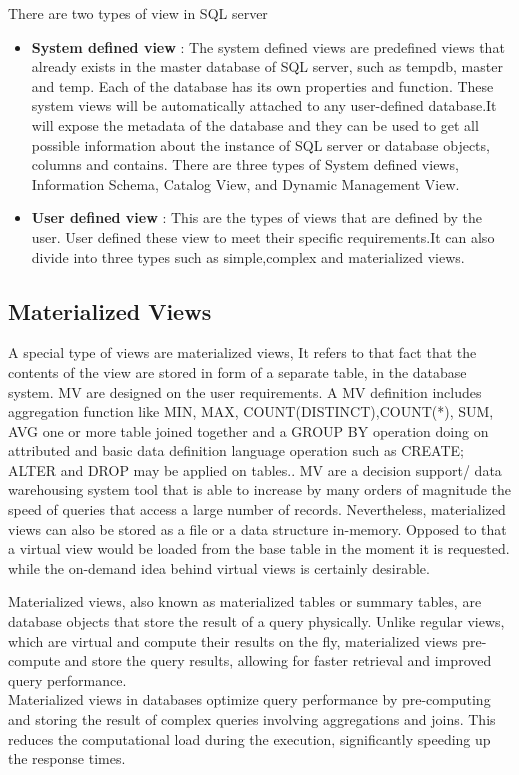There are two types of view in SQL server
\begin{itemize}
    \item \textbf{System defined view }: The system defined views are predefined views that already exists in the  master database of SQL server, such as tempdb, master and temp. Each of the database has its own properties and function. These system views will be automatically attached to any user-defined database.It will expose the metadata of the database and they can be used to get all possible information about the instance of SQL server or database objects, columns and contains. There are three types of System defined views, Information Schema, Catalog View, and Dynamic Management View. \cite{chauhan-2024}
    \item \textbf{User defined view }: This are the types of views that are defined by the user. User defined these view to meet their specific requirements.It can also divide into three types such as simple,complex and materialized views.\cite{javapoint-author-2024}
\end{itemize}
   
\subsection{Materialized Views }
 A special type of views are materialized views, It refers to that fact that the contents of the view are stored in form of a separate table, in the database system. MV are designed on the user requirements. A MV definition includes aggregation function like MIN, MAX, COUNT(DISTINCT),COUNT(*), SUM, AVG one or more table joined together and a GROUP BY operation doing on attributed and basic data definition language operation such as CREATE; ALTER and DROP may be applied on tables.\cite{Kardel_Thakare}. MV are a decision support/ data warehousing system tool that is able to increase by many orders of magnitude the speed of queries that access a large number of records.\cite{Kishan_Sainath} Nevertheless, materialized views can also be stored as a file or a data structure in-memory. Opposed to that a virtual view would be loaded from the base table in the moment it is requested. while the on-demand idea behind virtual views is certainly desirable.\cite{jan-no-date,ashadevi-2024}

\begin{definition}
Materialized views, also known as materialized tables or summary tables, are database objects that store the result of a query physically. Unlike regular views, which are virtual and compute their results on the fly, materialized views pre-compute and store the query results, allowing for faster retrieval and improved query performance.\\
Materialized views in databases optimize query performance by pre-computing and storing the result of complex queries involving aggregations and joins. This reduces the computational load during the execution, significantly speeding up the response times.

\end{definition}

